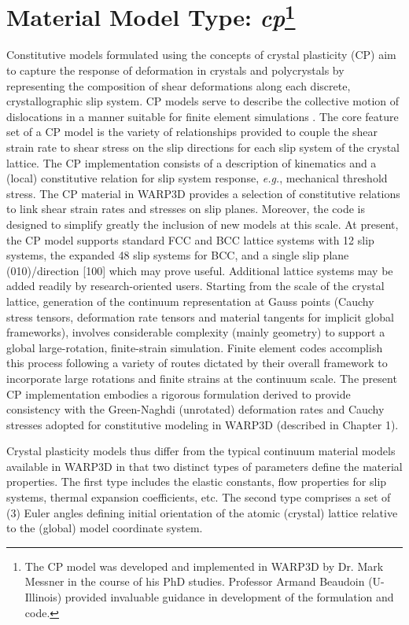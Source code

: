 \documentclass[11pt]{report}
\numberwithin{equation}{section}
\newcommand{\eg}{\emph{e.g.},\xspace}
\begin{document}
\section{Material Model Type: \textit{cp}\footnote{The CP model was developed and implemented in WARP3D by Dr. 
Mark Messner \cite{MMthesis14} in the course of his PhD studies. Professor
Armand Beaudoin (U-Illinois) provided invaluable guidance in development of the 
formulation and code.}}
Constitutive models formulated using the concepts of crystal plasticity (CP) aim to capture the response 
of deformation in crystals and polycrystals by representing the composition of  shear deformations along each 
discrete, crystallographic slip system.  CP models serve to describe the collective motion of dislocations 
in a manner suitable for finite element simulations \cite{ REHTBR10,BA13}. The core feature set of a CP 
model is the variety of relationships provided to couple the shear strain rate to shear stress on the slip 
directions for each slip system of the crystal lattice. The CP implementation consists of a description of 
kinematics and a (local) constitutive relation for slip system response, \eg mechanical threshold stress. 
The CP material in WARP3D provides a selection of constitutive relations to link shear strain rates and 
stresses on slip planes. Moreover, the code is designed to simplify greatly the inclusion of new models 
at this scale. At present, the
CP model supports standard FCC and BCC lattice systems with 12 slip systems, the expanded 48 slip systems for BCC, and a single slip plane (010)/direction [100]
which may prove useful.
Additional lattice systems may be added readily by research-oriented users.
Starting from the scale of the crystal lattice, generation of the continuum representation at 
Gauss points (Cauchy stress tensors, deformation rate tensors and material tangents for 
implicit global frameworks), involves considerable complexity (mainly geometry) to support 
a global large-rotation, finite-strain simulation.  Finite element codes accomplish this process 
following a variety of routes dictated by their overall framework to incorporate large rotations 
and finite strains at the continuum scale. The present CP implementation embodies a rigorous 
formulation derived to provide consistency with the Green-Naghdi (unrotated) deformation  
rates and Cauchy stresses adopted for constitutive modeling in WARP3D (described in Chapter 1).

Crystal plasticity models thus differ from the typical continuum material models available in 
WARP3D in that two distinct types of parameters define the material  properties. The first type 
includes the  elastic constants,
flow properties for slip systems, thermal expansion coefficients, etc.  The second type 
comprises a set of (3) Euler angles defining  initial orientation of the atomic (crystal) 
lattice relative to the (global) model coordinate system.
\end{document}
